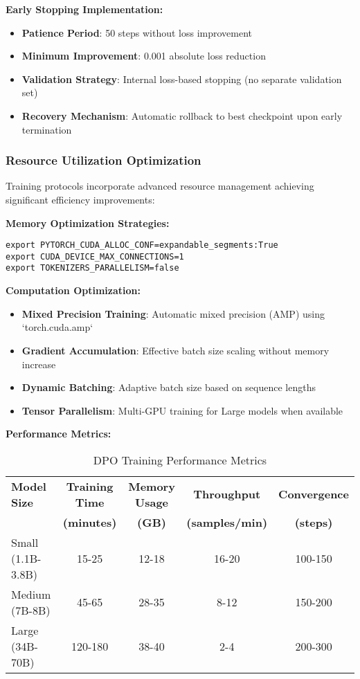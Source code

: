 \textbf{Early Stopping Implementation:}
\begin{itemize}
    \item \textbf{Patience Period}: 50 steps without loss improvement
    \item \textbf{Minimum Improvement}: 0.001 absolute loss reduction
    \item \textbf{Validation Strategy}: Internal loss-based stopping (no separate validation set)
    \item \textbf{Recovery Mechanism}: Automatic rollback to best checkpoint upon early termination
\end{itemize}

\subsubsection{Resource Utilization Optimization}

Training protocols incorporate advanced resource management achieving significant efficiency improvements:

\textbf{Memory Optimization Strategies:}
\begin{verbatim}
export PYTORCH_CUDA_ALLOC_CONF=expandable_segments:True
export CUDA_DEVICE_MAX_CONNECTIONS=1
export TOKENIZERS_PARALLELISM=false
\end{verbatim}

\textbf{Computation Optimization:}
\begin{itemize}
    \item \textbf{Mixed Precision Training}: Automatic mixed precision (AMP) using `torch.cuda.amp`
    \item \textbf{Gradient Accumulation}: Effective batch size scaling without memory increase
    \item \textbf{Dynamic Batching}: Adaptive batch size based on sequence lengths
    \item \textbf{Tensor Parallelism}: Multi-GPU training for Large models when available
\end{itemize}

\textbf{Performance Metrics:}
\begin{table}[H]
\centering
\caption{DPO Training Performance Metrics}
\label{tab:dpo-performance-metrics}
\begin{tabular}{lcccc}
\toprule
\textbf{Model Size} & \textbf{Training Time} & \textbf{Memory Usage} & \textbf{Throughput} & \textbf{Convergence} \\
& \textbf{(minutes)} & \textbf{(GB)} & \textbf{(samples/min)} & \textbf{(steps)} \\
\midrule
Small (1.1B-3.8B) & 15-25 & 12-18 & 16-20 & 100-150 \\
Medium (7B-8B) & 45-65 & 28-35 & 8-12 & 150-200 \\
Large (34B-70B) & 120-180 & 38-40 & 2-4 & 200-300 \\
\bottomrule
\end{tabular}
\end{table}

